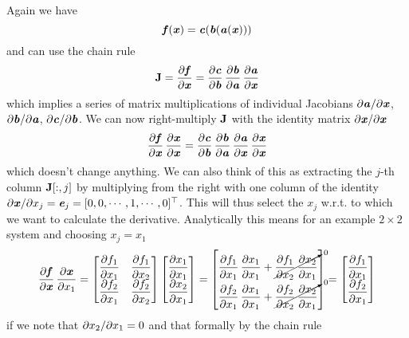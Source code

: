 \documentclass[11pt]{scrartcl}
\begin{document}
Again we have
\begin{equation}
    \ve f(\ve x) = \ve c(\ve b(\ve a(\ve x)))
\end{equation}
and can use the chain rule
\begin{equation}
    \ma J=\pd{\ve f}{\ve x} = \pd{\ve c}{\ve b}\,\pd{\ve b}{\ve a}\,\pd{\ve a}{\ve x}
\end{equation}
which implies a series of matrix multiplications of individual Jacobians $\pdi{\ve
a}{\ve x}$, $\pdi{\ve b}{\ve a}$, $\pdi{\ve c}{\ve b}$.
We can now right-multiply $\ma J$ with the identity
matrix $\pdi{\ve x}{\ve x}$
\begin{equation}
    \pd{\ve f}{\ve x}\,\pd{\ve x}{\ve x} =
    \pd{\ve c}{\ve b}\,\pd{\ve b}{\ve a}\,\pd{\ve a}{\ve x}\,\pd{\ve x}{\ve x}
\end{equation}
which doesn't change anything. We can also think of this as extracting the
$j$-th column $\ma J[:,j]$ by multiplying from the right with one column of the
identity $\partial\ve x/\partial x_j = \ve e_j = \tp{[0,0,\cdots,1,\cdots, 0]}$.
This will thus select the $x_j$ w.r.t. to which we want to calculate the
derivative. Analytically this means for an example $2\times 2$ system and choosing
$x_j = x_1$
\begin{equation}
    \pd{\ve f}{\ve x}\,\pd{\ve x}{x_1}=
    \begin{bmatrix}
        \pd{f_1}{x_1} & \pd{f_1}{x_2} \\
        \pd{f_2}{x_1} & \pd{f_2}{x_2} \\
    \end{bmatrix}
    \begin{bmatrix}
        \pd{x_1}{x_1} \\
        \pd{x_2}{x_1} \\
    \end{bmatrix}
    =
    \begin{bmatrix}
        \pd{f_1}{x_1}\,\pd{x_1}{x_1} + \cancelto{0}{\pd{f_1}{x_2}\,\pd{x_2}{x_1}} \\
        \pd{f_2}{x_1}\,\pd{x_1}{x_1} + \cancelto{0}{\pd{f_2}{x_2}\,\pd{x_2}{x_1}} \\
    \end{bmatrix}
    =
    \begin{bmatrix}
        \pd{f_1}{x_1} \\
        \pd{f_2}{x_1} \\
    \end{bmatrix}
\end{equation}
%
if we note that $\pdi{x_2}{x_1}=0$ and that formally by the chain rule
\end{document}
